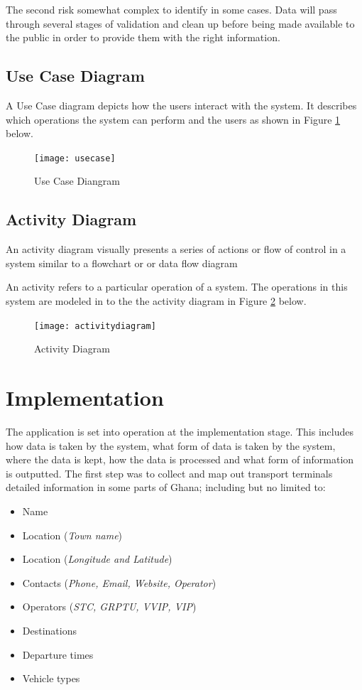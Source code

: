 The second risk somewhat complex to identify in some cases. Data will pass through several stages of validation and clean up before being made available to the public in order to provide them with the right information.

\subsection{Use Case Diagram}
A Use Case diagram depicts how the users interact with the system. It describes which operations the system can perform and the users as shown in Figure \ref{fig:usecase} below.

\begin{figure}[H]
	\centering
	\texttt{[image: usecase]}
	\caption[Use Case Diangram]{Use Case Diangram}
	\label{fig:usecase}
\end{figure}


\subsection{Activity Diagram}
An activity diagram visually presents a series of actions or flow of control in a system similar to a flowchart or or data flow diagram 

An activity refers to a particular operation of a system. The operations in this system are modeled in to the the activity diagram in Figure \ref{fig:activitydiagram} below.

\begin{figure}[H]
	\centering
	\texttt{[image: activitydiagram]}
	\caption[Activity Diagram]{Activity Diagram}
	\label{fig:activitydiagram}
\end{figure}


\section{Implementation}
The application is set into operation at the implementation stage. This includes how data is taken by the system, what form of data is taken by the system, where the data is kept, how the data is processed and what form of information is outputted. The first step was to collect and map out transport terminals detailed information in some parts of Ghana; including but no limited to:
\begin{itemize}
	\item Name
	\item Location (\textit{Town name})
	\item Location (\textit{Longitude and Latitude})
	\item Contacts (\textit{Phone, Email, Website, Operator})
	\item Operators (\textit{STC, GRPTU, VVIP, VIP})
	\item Destinations
	\item Departure times
	\item Vehicle types
\end{itemize}

